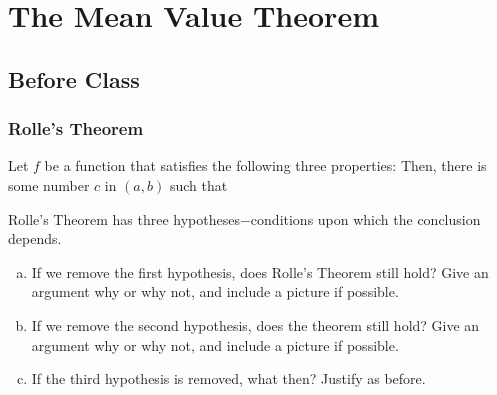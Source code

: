 \documentclass[notes]{subfiles}
\begin{document}
	\fancyhead[LO,RE]{\bfseries \currentname}
	\fancyfoot[C]{{}}
	\fancyfoot[RO,LE]{\large \thepage}	%
	
\section*{The Mean Value Theorem}\label{cs32}
	\subsection*{Before Class}
	\subsubsection*{Rolle's Theorem}
		\begin{thm}
			Let $f$ be a function that satisfies the following three properties:
			Then, there is some number $c$ in $(a,b)$ such that 
		\end{thm}
		
		\begin{pf}
		
		\end{pf}
			\newpage
		\begin{ex}
			Rolle's Theorem has three hypotheses$-$conditions upon which the conclusion depends.
			\begin{enumerate}[(a)]
				\item If we remove the first hypothesis, does Rolle's Theorem still hold?  Give an argument why or why not, and include a picture if possible.
					
				\item If we remove the second hypothesis, does the theorem still hold?  Give an argument why or why not, and include a picture if possible.
					
				\item If the third hypothesis is removed, what then?  Justify as before.
					
			\end{enumerate}
		\end{ex}	
\end{document}
